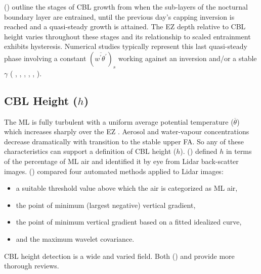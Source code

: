 \citeauthor{StullNelEl} (\citeyear{StullNelEl}) outline the stages of \acs{CBL} growth from when the sub-layers of the nocturnal boundary layer are entrained, until the previous day's capping inversion is reached and a quasi-steady growth is attained.  The \acs{EZ} depth relative to \acs{CBL} height varies throughout these stages and its relationship to scaled entrainment exhibits hysteresis.  Numerical studies typically represent this last quasi-steady phase involving a constant $(\overline{w^{'}\theta^{'}})_{s}$ working against an inversion and/or a stable $\gamma$ (\citeauthor{SchmidtSchu} \citeyear{SchmidtSchu}, \citeauthor{Sorbjan1} \citeyear{Sorbjan1}, \citeauthor{SullMoengStev} \citeyear{SullMoengStev}, \citeauthor{FedConzMir04} \citeyear{FedConzMir04}, \citeauthor{BrooksFowler2} \citeyear{BrooksFowler2}, \citeauthor{GarciaMellado} \citeyear{GarciaMellado}).  

\subsection{CBL Height ($h$)}
\label{subsec:cblh}

The \acs{ML} is fully turbulent with a uniform average potential temperature ($\overline{\theta}$) which increases sharply over the \acs{EZ} . Aerosol and water-vapour concentrations decrease dramatically with transition to the stable upper \acs{FA}.  So any of these characteristics can support a definition of \acs{CBL} height ($h$).  \citeauthor{StullNelEl} (\citeyear{StullNelEl}) defined $h$ in terms of the percentage of \acs{ML} air and identified it by eye from Lidar back-scatter images.  \citeauthor{Traum11} (\citeyear{Traum11}) compared four automated methods applied to Lidar images:
 
\begin{itemize}
\item{a suitable threshold value above which the air is categorized as \acs{ML} air,}  
\item{the point of minimum (largest negative) vertical gradient,}
\item{the point of minimum vertical gradient based on a fitted idealized curve,}
 \item{and the maximum wavelet covariance.}  
\end{itemize}

\acs{CBL} height detection is a wide and varied field.  Both \citeauthor{BrooksFowler2} (\citeyear{BrooksFowler2}) and \citeauthor{Traum11} \citeyear{Traum11} provide more thorough reviews.\\

